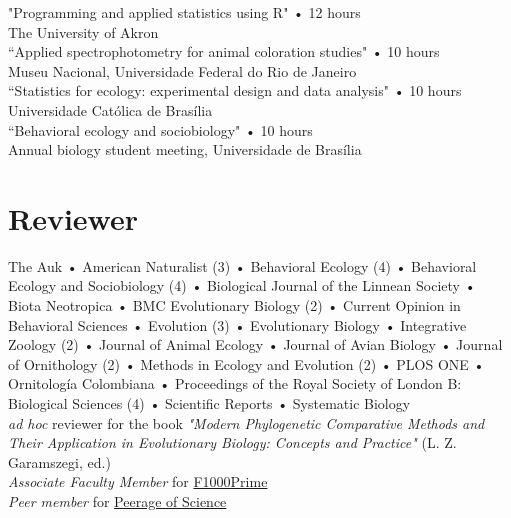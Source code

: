 \documentclass[10pt]{article}
\newcommand{\years}[1]{\marginnote{\raggedleft\scriptsize #1}}
\begin{document}
\years{2013} "Programming and applied statistics using R" • 12 hours\\ The University of Akron\\

\years{2010} “Applied spectrophotometry for animal coloration studies" • 10 hours\\ Museu Nacional, Universidade Federal do Rio de Janeiro\\

\years{2008} “Statistics for ecology: experimental design and data analysis" • 10 hours\\ Universidade Católica de Brasília\\

\years{2006} “Behavioral ecology and sociobiology" • 10 hours\\ Annual biology student meeting, Universidade de Brasília



\section*{Reviewer}
The Auk • American Naturalist (3) • Behavioral Ecology (4) • Behavioral Ecology and Sociobiology (4) • Biological Journal of the Linnean Society • Biota Neotropica • \textsc{BMC} Evolutionary Biology (2) • Current Opinion in Behavioral Sciences • Evolution (3) • Evolutionary Biology • Integrative Zoology (2) • Journal of Animal Ecology • Journal of Avian Biology • Journal of Ornithology (2) • Methods in Ecology and Evolution (2) • \textsc{PLOS ONE} • Ornitolog\'{i}a Colombiana • Proceedings of the Royal Society of London B: Biological Sciences (4) • Scientific Reports • Systematic Biology\\

\textit{ad hoc} reviewer for the book \textit{"Modern Phylogenetic Comparative Methods and Their Application in Evolutionary Biology: Concepts and Practice"} (L. Z. Garamszegi, ed.)\\

\textit{Associate Faculty Member} for \href{http://f1000.com/prime/thefaculty/member/499999771097524591}{F1000Prime}\\

\textit{Peer member} for \href{http://www.peerageofscience.org/}{Peerage of Science}
\end{document}
